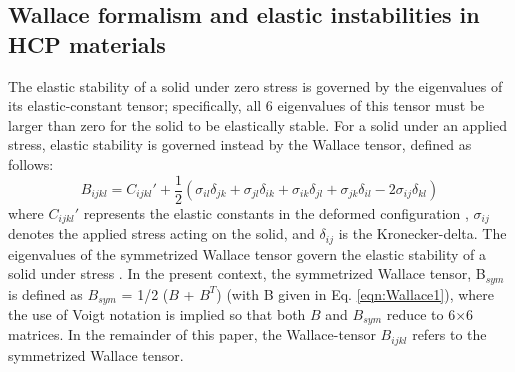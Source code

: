 \documentclass[showpacs,aps,floatfix,prb,reprint,superscriptaddress]{revtex4-1}
\begin{document}
\subsection{Wallace formalism and elastic instabilities in HCP materials}
The elastic stability of a solid under zero stress is governed by the eigenvalues of its elastic-constant tensor; specifically, all 6 eigenvalues of this tensor must be larger than zero for the solid to be elastically stable. For a solid under an applied stress, elastic stability is governed instead by the Wallace tensor, defined as follows:
\begin{equation}
\label{eqn:Wallace1}
B_{ijkl} = C_{ijkl}' + \frac{1}{2} \left(\sigma_{il} \delta_{jk} + \sigma_{jl} \delta_{ik} + \sigma_{ik} \delta_{jl} + \sigma_{jk} \delta_{il} - 2\sigma_{ij} \delta_{kl} \right)
\end{equation}
where $C_{ijkl}'$ represents the elastic constants in the deformed configuration \cite{wallace1998thermodynamics,ray1988elastic,wang1993crystal}, $\sigma_{ij}$ denotes the applied stress acting on the solid, and $\delta_{ij}$ is the Kronecker-delta. The eigenvalues of the symmetrized Wallace tensor govern the elastic stability of a solid under stress \cite{wang1995mechanical}. In the present context, the symmetrized Wallace tensor, B$_{sym}$ is defined as  $B_{sym}$ = 1/2 ($B$ + $B^{T}$) (with B given in Eq. \ref{eqn:Wallace1}), where the use of Voigt notation is implied so that both $B$ and $B_{sym}$ reduce to 6$\times$6 matrices. In the remainder of this paper, the Wallace-tensor $B_{ijkl}$ refers to the symmetrized Wallace tensor. 
\end{document}
